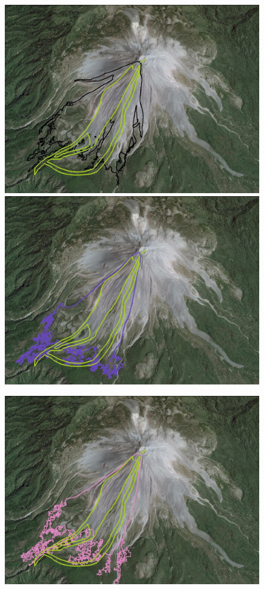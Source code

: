 \documentclass[letterpaper,10pt]{article}
\begin{document}
\begin{figure}[H]
\begin{minipage}[b]{.5\linewidth}
        \centering
                \includegraphics[width=.95\textwidth]{IMAGES/tiny1.jpg}
                \includegraphics[width=.95\textwidth]{IMAGES/levelset1.jpg}
\end{minipage}
\begin{minipage}[b]{.5 \linewidth}
                \centering
                \includegraphics[width=.95\textwidth]{IMAGES/phasefield1.jpg}

\end{minipage}
\end{figure}
\end{document}
